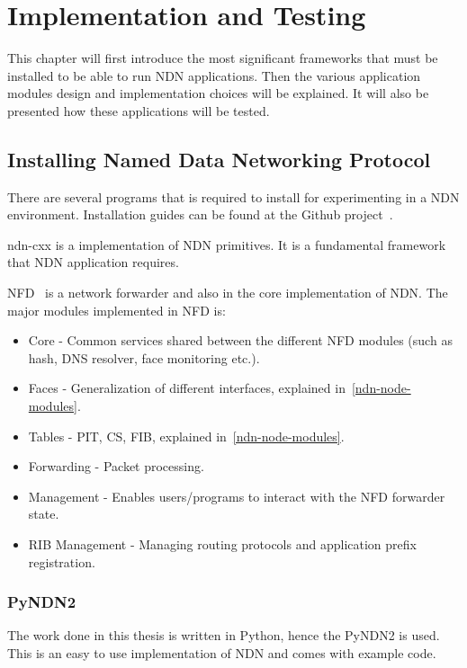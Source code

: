 \chapter{Implementation and Testing}
This chapter will first introduce the most significant frameworks that must be installed to be able to run \gls{NDN} applications.
Then the various application modules design and implementation choices will be explained. 
It will also be presented how these applications will be tested.

\section{Installing Named Data Networking Protocol}

There are several programs that is required to install for experimenting in a \gls{NDN} environment.
Installation guides can be found at the Github project~\cite{ndn-git}.

\gls{ndn-cxx} is a implementation of \gls{NDN} primitives. 
It is a fundamental framework that \gls{NDN} application requires. 

\gls{NFD}~\cite{nfd} is a network forwarder and also in the core implementation of \gls{NDN}.
The major modules implemented in \gls{NFD} is:
\begin{itemize}
  \item Core - Common services shared between the different \gls{NFD} modules (such as hash, \gls{DNS} resolver, face monitoring etc.).
  \item Faces - Generalization of different interfaces, explained in~\autoref{ndn-node-modules}.
  \item Tables - \gls{PIT}, \gls{CS}, \gls{FIB}, explained in~\autoref{ndn-node-modules}.
  \item Forwarding - Packet processing.
  \item Management - Enables users/programs to interact with the \gls{NFD} forwarder state.
  \item\gls{RIB} Management - Managing routing protocols and application prefix registration.
\end{itemize}

\subsection{PyNDN2}
The work done in this thesis is written in Python, hence the \gls{PyNDN2} is used.
This is an easy to use implementation of \gls{NDN} and comes with example code.

